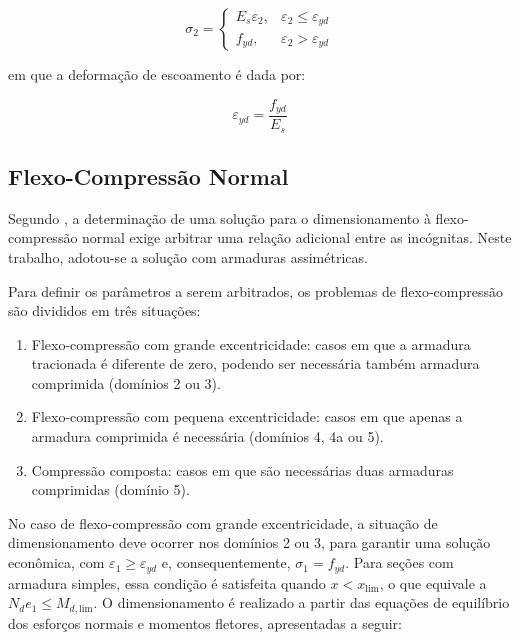 \begin{equation}
\sigma_2=
\begin{cases}
E_s\varepsilon_2, & \varepsilon_2\leq\varepsilon_{yd}\\
f_{yd}, & \varepsilon_2>\varepsilon_{yd}
\end{cases}
\end{equation}

em que a deformação de escoamento é dada por:

\begin{equation}
\varepsilon_{yd}=\frac{f_{yd}}{E_s}
\end{equation}

\subsection{Flexo-Compressão Normal}

Segundo , a determinação de uma solução para o dimensionamento à flexo-compressão normal exige arbitrar uma relação adicional entre as incógnitas. Neste trabalho, adotou-se a solução com armaduras assimétricas.

Para definir os parâmetros a serem arbitrados, os problemas de flexo-compressão são divididos em três situações:

\begin{enumerate}[label=\alph*)]
    \item Flexo-compressão com grande excentricidade: casos em que a armadura tracionada é diferente de zero, podendo ser necessária também armadura comprimida (domínios 2 ou 3).

    \item Flexo-compressão com pequena excentricidade: casos em que apenas a armadura comprimida é necessária (domínios 4, 4a ou 5).

    \item Compressão composta: casos em que são necessárias duas armaduras comprimidas (domínio 5).
\end{enumerate}

No caso de flexo-compressão com grande excentricidade, a situação de dimensionamento deve ocorrer nos domínios 2 ou 3, para garantir uma solução econômica, com $\varepsilon_1 \geq \varepsilon_{yd}$ e, consequentemente, $\sigma_1 = f_{yd}$. Para seções com armadura
simples, essa condição é satisfeita quando $x < x_{\mathrm{lim}}$,
o que equivale a $N_d e_1 \leq M_{d,\mathrm{lim}}$. O dimensionamento é realizado a partir das equações de equilíbrio dos esforços normais e momentos fletores, apresentadas a seguir:


